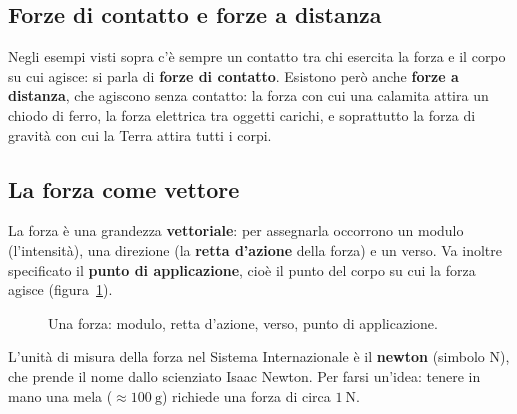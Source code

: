 \subsection{Forze di contatto e forze a distanza}
Negli esempi visti sopra c'è sempre un contatto tra chi esercita la forza e il corpo su cui agisce: si parla di \textbf{forze di contatto}. Esistono però anche \textbf{forze a distanza}, che agiscono senza contatto: la forza con cui una calamita attira un chiodo di ferro, la forza elettrica tra oggetti carichi, e soprattutto la forza di gravità con cui la Terra attira tutti i corpi.

\subsection{La forza come vettore}
La forza è una grandezza \textbf{vettoriale}: per assegnarla occorrono un modulo (l'intensità), una direzione (la \textbf{retta d'azione} della forza) e un verso. Va inoltre specificato il \textbf{punto di applicazione}, cioè il punto del corpo su cui la forza agisce (figura~\ref{fig:forzavettore}).

\begin{figure}[h!]
\centering
{}
\caption{Una forza: modulo, retta d'azione, verso, punto di applicazione.}
\label{fig:forzavettore}
\end{figure}

L'unità di misura della forza nel Sistema Internazionale è il \textbf{newton} (simbolo $\si{\newton}$), che prende il nome dallo scienziato Isaac Newton. Per farsi un'idea: tenere in mano una mela ($\approx \SI{100}{\gram}$) richiede una forza di circa $\SI{1}{\newton}$.

